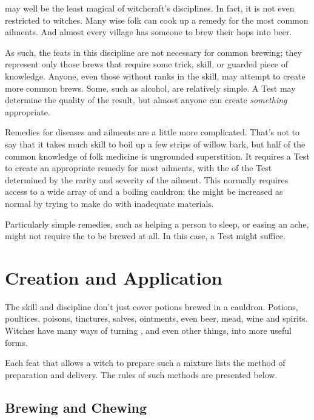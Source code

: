 
 may well be the least magical of witchcraft's disciplines.
In fact, it is not even restricted to witches.
Many wise folk can cook up a remedy for the most common ailments.
And almost every village has someone to brew their hops into beer.

As such, the feats in this discipline are not necessary for common brewing; they represent only those brews that require some trick, skill, or guarded piece of knowledge.
Anyone, even those without ranks in the  skill, may attempt to create more common brews.
Some, such as alcohol, are relatively simple.
A Test may determine the quality of the result, but almost anyone can create \emph{something} appropriate.

Remedies for diseases and ailments are a little more complicated.
That's not to say that it takes much skill to boil up a few strips of willow bark, but half of the common knowledge of folk medicine is ungrounded superstition.
It requires a  Test to create an appropriate remedy for most ailments, with the {\tn} of the Test determined by the rarity and severity of the ailment.
This normally requires access to a wide array of  and a boiling cauldron; the {\tn} might be increased as normal by trying to make do with inadequate materials.

Particularly simple remedies, such as helping a person to sleep, or easing an ache, might not require the  to be brewed at all.
In this case, a  Test might suffice.

\section{Creation and Application}

The  skill and  discipline don't just cover potions brewed in a cauldron.
Potions, poultices, poisons, tinctures, salves, ointments, even beer, mead, wine and spirits.
Witches have many ways of turning , and even other things, into more useful forms.

Each feat that allows a witch to prepare such a mixture lists the method of preparation and delivery.
The rules of such methods are presented below.

\subsection{Brewing and Chewing}

